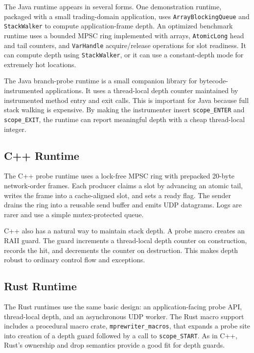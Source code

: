 \documentclass[11pt]{article}
\newcommand{\code}[1]{\texttt{#1}}
\begin{document}
The Java runtime appears in several forms. One demonstration runtime, packaged
with a small trading-domain application, uses \code{ArrayBlockingQueue} and
\code{StackWalker} to compute application-frame depth. An optimized benchmark
runtime uses a bounded MPSC ring implemented with arrays, \code{AtomicLong}
head and tail counters, and \code{VarHandle} acquire/release operations for
slot readiness. It can compute depth using \code{StackWalker}, or it can use a
constant-depth mode for extremely hot locations.

The Java branch-probe runtime is a small companion library for bytecode-
instrumented applications. It uses a thread-local depth counter maintained by
instrumented method entry and exit calls. This is important for Java because
full stack walking is expensive. By making the instrumenter insert
\code{scope\_ENTER} and \code{scope\_EXIT}, the runtime can report meaningful
depth with a cheap thread-local integer.

\subsection{C++ Runtime}

The C++ probe runtime uses a lock-free MPSC ring with prepacked 20-byte
network-order frames. Each producer claims a slot by advancing an atomic tail,
writes the frame into a cache-aligned slot, and sets a ready flag. The sender
drains the ring into a reusable send buffer and emits UDP datagrams. Logs are
rarer and use a simple mutex-protected queue.

C++ also has a natural way to maintain stack depth. A probe macro creates an
RAII guard. The guard increments a thread-local depth counter on construction,
records the hit, and decrements the counter on destruction. This makes depth
robust to ordinary control flow and exceptions.

\subsection{Rust Runtime}

The Rust runtimes use the same basic design: an application-facing probe API,
thread-local depth, and an asynchronous UDP worker. The Rust macro support
includes a procedural macro crate, \code{mprewriter\_macros}, that expands a
probe site into creation of a depth guard followed by a call to
\code{scope\_START}. As in C++, Rust's ownership and drop semantics provide a
good fit for depth guards.
\end{document}
